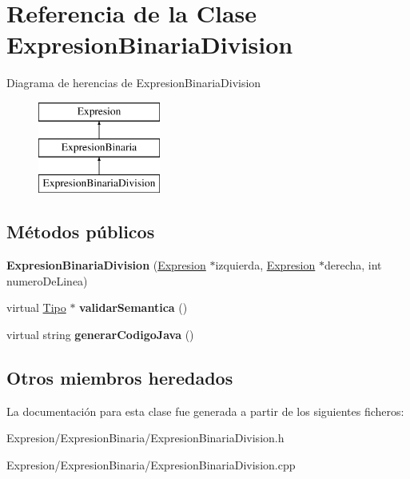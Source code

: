 \hypertarget{class_expresion_binaria_division}{\section{Referencia de la Clase Expresion\-Binaria\-Division}
\label{class_expresion_binaria_division}
}
Diagrama de herencias de Expresion\-Binaria\-Division\begin{figure}[H]
\begin{center}
\leavevmode
\includegraphics[height=3.000000cm]{class_expresion_binaria_division}
\end{center}
\end{figure}
\subsection*{Métodos públicos}
\begin{DoxyCompactItemize}
\item 
\hypertarget{class_expresion_binaria_division_afe1810c85fd586bfc76abdbc77332129}{{\bfseries Expresion\-Binaria\-Division} (\hyperlink{class_expresion}{Expresion} $\ast$izquierda, \hyperlink{class_expresion}{Expresion} $\ast$derecha, int numero\-De\-Linea)}\label{class_expresion_binaria_division_afe1810c85fd586bfc76abdbc77332129}

\item 
\hypertarget{class_expresion_binaria_division_aee97ebfc28e0fe9d7336b9ad4cc3343b}{virtual \hyperlink{class_tipo}{Tipo} $\ast$ {\bfseries validar\-Semantica} ()}\label{class_expresion_binaria_division_aee97ebfc28e0fe9d7336b9ad4cc3343b}

\item 
\hypertarget{class_expresion_binaria_division_a3d70135392ad0a69b898a654a8c6eba7}{virtual string {\bfseries generar\-Codigo\-Java} ()}\label{class_expresion_binaria_division_a3d70135392ad0a69b898a654a8c6eba7}

\end{DoxyCompactItemize}
\subsection*{Otros miembros heredados}


La documentación para esta clase fue generada a partir de los siguientes ficheros\-:\begin{DoxyCompactItemize}
\item 
Expresion/\-Expresion\-Binaria/Expresion\-Binaria\-Division.\-h\item 
Expresion/\-Expresion\-Binaria/Expresion\-Binaria\-Division.\-cpp\end{DoxyCompactItemize}
